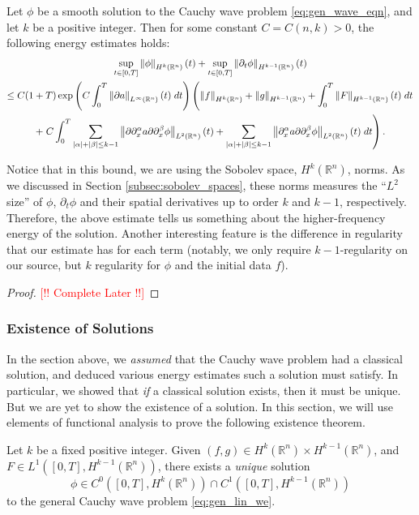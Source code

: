 \documentclass{article}
\newcommand{\complete}{\textcolor{red}{[!! Complete Later !!]}}
\numberwithin{equation}{section}
\begin{document}
	\begin{prop}
		Let $\phi$ be a smooth solution to the Cauchy wave problem \ref{eq:gen_wave_eqn}, and let $k$ be a positive integer. Then for some constant $C = C(n,k) > 0$, the following energy estimates holds: 
		\begin{multline}
			\sup_{t\in[0,T]}\left\Vert \phi \right\Vert_{H^{k}(\mathbb{R}^{n})}(t) + \sup_{t \in [0,T]}\left\Vert \partial_{t}\phi \right\Vert_{H^{k -1}(\mathbb{R}^{n})}(t) \\ \leq C(1 + T)\exp\left(C\int_{0}^{T}\left\Vert \partial a \right\Vert_{L^{\infty}(\mathbb{R}^{n})}(t)\;dt\right)\left(\left\Vert f \right\Vert_{H^{k}(\mathbb{R}^{n})} 
			+ \left\Vert g \right\Vert_{H^{k - 1}(\mathbb{R}^{n})} + \int_{0}^{T}\left\Vert F \right\Vert_{H^{k - 1}(\mathbb{R}^{n})}(t)\;dt\right.\\ + \left. C\int_{0}^{T}\sum_{|\alpha| + |\beta| \leq k - 1}\left\Vert \partial\partial_{x}^{\alpha}a\partial\partial_{x}^{\beta}\phi \right\Vert_{L^{2}(\mathbb{R}^{n})}(t) + \sum_{|\alpha| + |\beta| \leq k- 1}\left\Vert \partial_{x}^{\alpha}a\partial\partial_{x}^{\beta}\phi \right\Vert_{L^{2}(\mathbb{R}^{n})}(t)\;dt\right). 
		\end{multline}
	\end{prop}
	\begin{remark}
		Notice that in this bound, we are using the Sobolev space, $H^{k}(\mathbb{R}^{n})$, norms. As we discussed in Section \ref{subsec:sobolev_spaces}, these norms measures the ``$L^{2}$ size'' of $\phi$, $\partial_{t}\phi$ and their spatial derivatives up to order $k$ and $k - 1$, respectively. Therefore, the above estimate tells us something about the higher-frequency energy of the solution. Another interesting feature is the difference in regularity that our estimate has for each term (notably, we only require $k - 1$-regularity on our source, but $k$ regularity for $\phi$ and the initial data $f$). 
	\end{remark}
	\begin{proof}
		\complete
	\end{proof}
	
	\subsubsection{Existence of Solutions}
	In the section above, we \textit{assumed} that the Cauchy wave problem had a classical solution, and deduced various energy estimates such a solution must satisfy. In particular, we showed that \textit{if} a classical solution exists, then it must be unique. But we are yet to show the existence of a solution. In this section, we will use elements of functional analysis to prove the following existence theorem. 
	\begin{theorem}
		Let $k$ be a fixed positive integer. Given $(f, g) \in H^{k}(\mathbb{R}^{n}) \times H^{k - 1}(\mathbb{R}^{n})$, and $F \in L^{1}([0,T], H^{k - 1}(\mathbb{R}^{n}))$, there exists a \textit{unique} solution 
		\begin{equation*}
			\phi \in C^{0}([0,T], H^{k}(\mathbb{R}^{n})) \cap C^{1}([0,T], H^{k - 1}(\mathbb{R}^{n}))
		\end{equation*}
		to the general Cauchy wave problem \ref{eq:gen_lin_we}. 
	\end{theorem}
	
\end{document}
